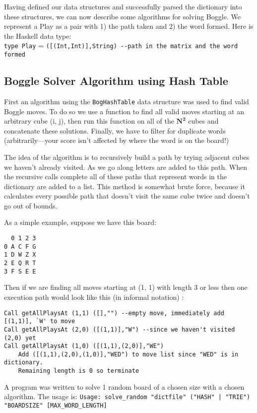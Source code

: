 \documentclass{article}
\begin{document}
Having defined our data structures and successfully parsed the dictionary into these structures, we can now describe some algorithms for solving Boggle. We represent a Play as a pair with 1) the path taken and 2) the word formed. Here is the Haskell data type:\\
\verb=type Play= = \verb=([(Int,Int)],String) --path in the matrix and the word formed=


\subsection{Boggle Solver Algorithm using Hash Table}
First an algorithm using the \verb=BogHashTable= data structure was used to find valid Boggle moves. To do so we use a function to find all valid moves starting at an arbitrary cube (i, j), then run this function on all of the $\mathbf{N^2}$ cubes and concatenate these solutions. Finally, we have to filter for duplicate words (arbitrarily---your score isn't affected by where the word is on the board!) 

The idea of the algorithm is to recursively build a path by trying adjacent cubes we haven't already visited. As we go along letters are added to this path. When the recursive calls complete all of these paths that represent words in the dictionary are added to a list. This method is somewhat brute force, because it calculates every possible path that doesn't visit the same cube twice and doesn't go out of bounds. 


As a simple example, suppose we have this board: 
\begin{verbatim}
  0 1 2 3
0 A C F G
1 D W Z X
2 E Q R T
3 F S E E
\end{verbatim}

Then if we are finding all moves starting at (1, 1) with length 3 or less then one execution path would look like this (in informal notation) :

\begin{verbatim}
Call getAllPlaysAt (1,1) ([],"") --empty move, immediately add [(1,1)], `W' to move
Call getAllPlaysAt (2,0) ([(1,1)],"W") --since we haven't visited (2,0) yet
Call getAllPlaysAt (1,0) ([(1,1),(2,0)],"WE")   
    Add ([(1,1),(2,0),(1,0)],"WED") to move list since "WED" is in dictionary.
    Remaining length is 0 so terminate
\end{verbatim} 

A program was written to solve 1 random board of a chosen size with a chosen algorithm. The usage is: 
\verb=Usage: solve_random "dictfile" ("HASH" | "TRIE") "BOARDSIZE" [MAX_WORD_LENGTH]=
\end{document}
